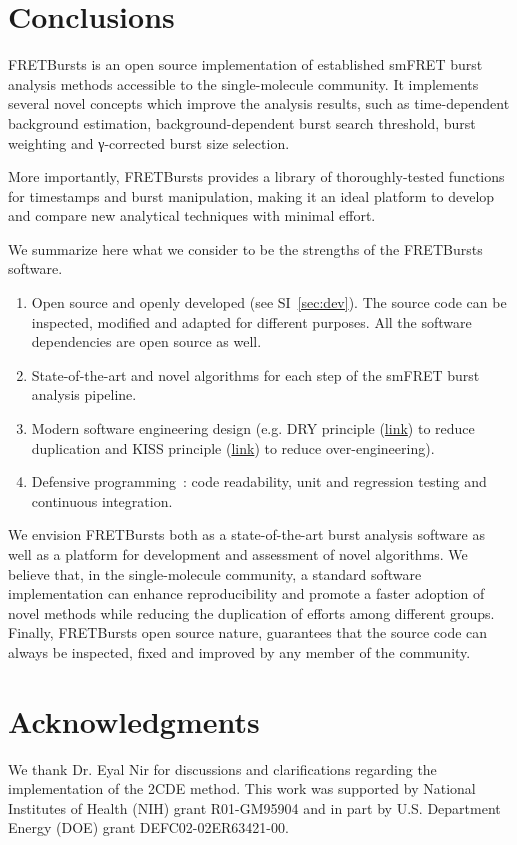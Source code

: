 \section{Conclusions}
\label{sec:conclusions}

FRETBursts is an open source implementation of established smFRET burst analysis methods
accessible to the single-molecule community.
It implements several novel concepts which improve the analysis results, such as
time-dependent background estimation, background-dependent burst search threshold,
burst weighting and γ-corrected burst size selection.

More importantly, FRETBursts provides a library of thoroughly-tested functions
for timestamps and burst manipulation, making it an ideal platform to
develop and compare new analytical techniques with minimal effort.

We summarize here what we consider to be the strengths
of the FRETBursts software.

\begin{enumerate}
\item Open source and openly developed (see SI~\ref{sec:dev}). The source code can be inspected, 
modified and adapted for different purposes. All the software dependencies are open source as well.
\item State-of-the-art and novel algorithms for each step of the
smFRET burst analysis pipeline.
\item Modern software engineering design (e.g. DRY principle
(\href{http://en.wikipedia.org/wiki/Don\%27t_repeat_yourself}{link})
to reduce duplication and KISS principle
(\href{http://en.wikipedia.org/wiki/KISS_principle}{link})
to reduce over-engineering).
\item Defensive programming~\cite{Prli__2012}: code readability,
unit and regression testing and continuous integration.
\end{enumerate}

We envision FRETBursts both as a state-of-the-art burst analysis
software as well as a platform for development and assessment of novel algorithms.
We believe that, in the single-molecule community,
a standard software implementation can enhance
reproducibility and promote a faster adoption of novel methods 
while reducing the duplication of efforts among different groups.
Finally, FRETBursts open source nature, guarantees that the source code
can always be inspected, fixed and improved
by any member of the community.


\section*{Acknowledgments}
We thank Dr. Eyal Nir for discussions and clarifications regarding the 
implementation of the 2CDE method.
This work was supported by National Institutes of Health (NIH)
grant R01-GM95904 and in part by U.S. Department Energy (DOE) grant DEFC02-02ER63421-00.
